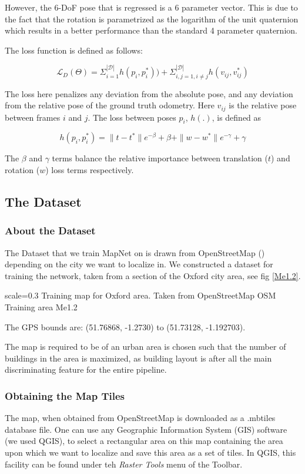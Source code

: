 However, the 6-DoF pose that is regressed is a 6 parameter vector. This is due to the fact that the rotation is parametrized as the logarithm of the unit quaternion which results in a better performance than the standard 4 parameter quaternion. 

The loss function is defined as follows:

\[ \mathcal{L}_D(\Theta)= \Sigma_{i=1}^{|\mathcal{D}|}h(p_i,p_i^{*})) + \Sigma_{i,j=1, i\neq j}^{|\mathcal{D}|}h(v_{ij},v_{ij}^{*}) \] 

The loss here penalizes any deviation from the absolute pose, and any deviation from the relative pose of the ground truth odometry. Here $v_{ij}$ is the relative pose between frames $i$ and $j$. The loss between poses $p_i$, $h(.)$, is defined as

\[ h(p_i,p_i^{*}) = \|t - t^*\|e^{-\beta} + \beta + \|w - w^*\|e^{-\gamma} + \gamma \]

The $\beta$ and $\gamma$ terms balance the relative importance between translation ($t$) and rotation ($w$) loss terms respectively. 

\subsection{The Dataset}

\subsubsection{About the Dataset}
The Dataset that we train MapNet on is drawn from OpenStreetMap (\cite{osm2017}) depending on the city we want to localize in. We constructed a dataset for training the network, taken from a section of the Oxford city area, see fig \ref{Me1.2}.

{scale=0.3}%
{Training map for Oxford area. Taken from OpenStreetMap}%
{OSM Training area}%
{Me1.2}

The GPS bounds are: (51.76868, -1.2730) to (51.73128, -1.192703).

The map is required to be of an urban area is chosen such that the number of buildings in the area is maximized, as building layout is after all the main discriminating feature for the entire pipeline. 

\subsubsection{Obtaining the Map Tiles}
The map, when obtained from OpenStreetMap is downloaded as a .mbtiles database file. One can use any Geographic Information System (GIS) software (we used QGIS), to select a rectangular area on this map containing the area upon which we want to localize and save this area as a set of tiles. In QGIS, this facility can be found under teh \emph{Raster Tools} menu of the Toolbar.

